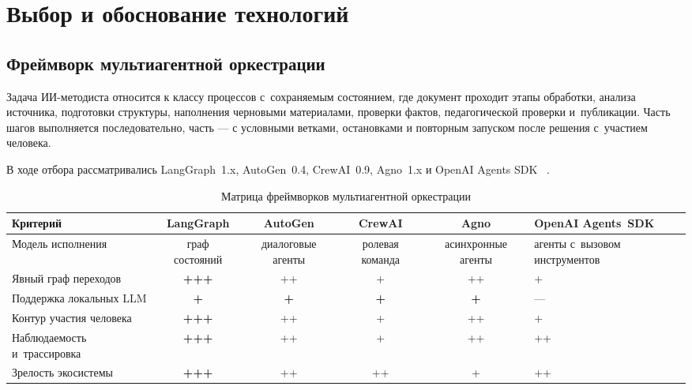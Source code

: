\section{Выбор и обоснование технологий}

\subsection{Фреймворк мультиагентной оркестрации}

Задача ИИ-методиста относится к классу процессов с~сохраняемым состоянием,
где документ проходит этапы обработки, анализа источника, подготовки
структуры, наполнения черновыми материалами, проверки фактов, педагогической проверки
и~публикации.
Часть шагов выполняется последовательно, часть — с условными ветками,
остановками и повторным запуском после решения с~участием человека.

В ходе отбора рассматривались LangGraph~1.x, AutoGen~0.4,
CrewAI~0.9, Agno~1.x и OpenAI Agents SDK
~\cite{langgraph_docs_2025, autogen_04_2024, crewai_docs_2025,
agno_docs_2025, openai_agents_sdk_2025}.

\begin{table}[H]
  \caption{Матрица фреймворков мультиагентной оркестрации}
  \label{tab:frameworks}
  \centering
  \begingroup
  \scriptsize
  \setlength{\tabcolsep}{2pt}
  \renewcommand{\arraystretch}{1.2}
  \begin{tabular}{|P{2.55cm}|c|c|c|c|P{2.0cm}|}
  \hline
  \textbf{Критерий}
    & \textbf{LangGraph}
    & \textbf{AutoGen}
    & \textbf{CrewAI}
    & \textbf{Agno}
    & \textbf{OpenAI Agents~SDK} \\
  \hline
  Модель исполнения
    & граф состояний
    & диалоговые агенты
    & ролевая команда
    & асинхронные агенты
    & агенты с~вызовом инструментов \\
  \hline
  Явный граф переходов
    & \textbf{+++}
    & ++
    & +
    & ++
    & + \\
  \hline
  Поддержка локальных LLM
    & \textbf{+}
    & \textbf{+}
    & \textbf{+}
    & \textbf{+}
    & — \\
  \hline
  Контур участия человека
    & \textbf{+++}
    & ++
    & +
    & ++
    & + \\
  \hline
  Наблюдаемость и~трассировка
    & \textbf{+++}
    & ++
    & +
    & ++
    & ++ \\
  \hline
  Зрелость экосистемы
    & \textbf{+++}
    & ++
    & ++
    & +
    & ++ \\
  \hline
  \end{tabular}
  \endgroup
\end{table}

